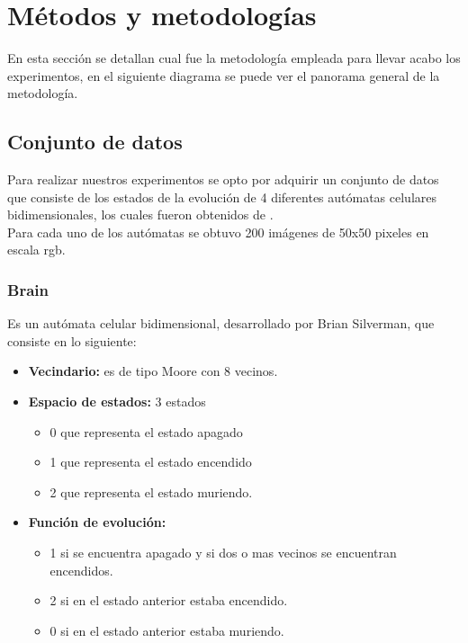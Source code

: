 \chapter{Métodos y metodologías}

En esta sección se detallan cual fue la metodología empleada para llevar acabo los experimentos, en el siguiente diagrama se puede ver el panorama general de la metodología.


\section{Conjunto de datos}

Para realizar nuestros experimentos se opto por adquirir un conjunto de datos que consiste de los estados de la evolución de 4 diferentes autómatas celulares bidimensionales, los cuales fueron obtenidos de \cite{rucker_walker}.
\\
Para cada uno de los autómatas se obtuvo 200 imágenes de 50x50 pixeles en escala rgb.

\subsection{Brain}

Es un autómata celular bidimensional, desarrollado por Brian Silverman, que consiste en lo siguiente:

\begin{itemize}
	\item \textbf{Vecindario:} es de tipo Moore con 8 vecinos.
	\item \textbf{Espacio de estados:} 3 estados
		\begin{itemize}
			\item 0 que representa el estado apagado
			\item 1 que representa el estado encendido
			\item 2 que representa el estado muriendo.
		\end{itemize}
	\item \textbf{Función de evolución:} 
		\begin{itemize}
			\item 1 si se encuentra apagado y si dos o mas vecinos se encuentran encendidos.
			\item 2 si en el estado anterior estaba encendido.
			\item 0 si en el estado anterior estaba muriendo.
		\end{itemize}
\end{itemize}

